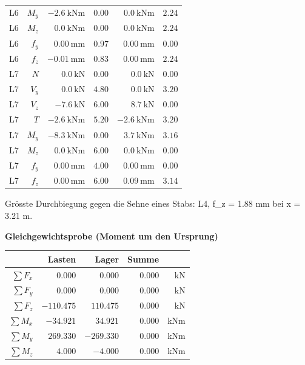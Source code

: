 \documentclass[11pt,a4paper]{article}
\begin{document}
\begin{longtable}{rrrrrr}
L6 & $M_y$ & $-2.6\ \mathrm{kNm}$ & $0.00$ & $0.0\ \mathrm{kNm}$ & $2.24$ \\
L6 & $M_z$ & $0.0\ \mathrm{kNm}$ & $0.00$ & $0.0\ \mathrm{kNm}$ & $2.24$ \\
L6 & $f_y$ & $0.00\ \mathrm{mm}$ & $0.97$ & $0.00\ \mathrm{mm}$ & $0.00$ \\
L6 & $f_z$ & $-0.01\ \mathrm{mm}$ & $0.83$ & $0.00\ \mathrm{mm}$ & $2.24$ \\
L7 & $N$ & $0.0\ \mathrm{kN}$ & $0.00$ & $0.0\ \mathrm{kN}$ & $0.00$ \\
L7 & $V_y$ & $0.0\ \mathrm{kN}$ & $4.80$ & $0.0\ \mathrm{kN}$ & $3.20$ \\
L7 & $V_z$ & $-7.6\ \mathrm{kN}$ & $6.00$ & $8.7\ \mathrm{kN}$ & $0.00$ \\
L7 & $T$ & $-2.6\ \mathrm{kNm}$ & $5.20$ & $-2.6\ \mathrm{kNm}$ & $3.20$ \\
L7 & $M_y$ & $-8.3\ \mathrm{kNm}$ & $0.00$ & $3.7\ \mathrm{kNm}$ & $3.16$ \\
L7 & $M_z$ & $0.0\ \mathrm{kNm}$ & $6.00$ & $0.0\ \mathrm{kNm}$ & $0.00$ \\
L7 & $f_y$ & $0.00\ \mathrm{mm}$ & $4.00$ & $0.00\ \mathrm{mm}$ & $0.00$ \\
L7 & $f_z$ & $0.00\ \mathrm{mm}$ & $6.00$ & $0.09\ \mathrm{mm}$ & $3.14$ \\
\hline
\end{longtable}
Grösste Durchbiegung gegen die Sehne eines Stabs: L4, f\_z = 1.88 mm bei x = 3.21 m.

\noindent\textbf{Gleichgewichtsprobe (Moment um den Ursprung)}
\begin{longtable}{rrrrr}
\hline
 & Lasten & Lager & Summe &  \\
\hline
\endhead
$\sum F_x$ & $0.000$ & $0.000$ & $0.000$ & kN \\
$\sum F_y$ & $0.000$ & $0.000$ & $0.000$ & kN \\
$\sum F_z$ & $-110.475$ & $110.475$ & $0.000$ & kN \\
$\sum M_x$ & $-34.921$ & $34.921$ & $0.000$ & kNm \\
$\sum M_y$ & $269.330$ & $-269.330$ & $0.000$ & kNm \\
$\sum M_z$ & $4.000$ & $-4.000$ & $0.000$ & kNm \\
\hline
\end{longtable}
\end{document}
